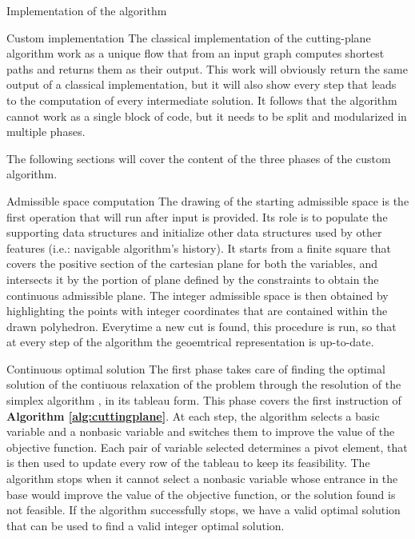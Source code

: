 \documentclass[9pt]{extarticle}
\begin{document}
\begin{section}{Implementation of the algorithm}
        \begin{subsection}{Custom implementation}
            The classical implementation of the cutting-plane algorithm work as a unique flow that from an input graph computes shortest paths 
            and returns them as their output.
            This work will obviously return the same output of a classical implementation, but it will also show every step that
            leads to the computation of every intermediate solution.
            It follows that the algorithm cannot work as a single block of code, but it needs to be split and modularized in multiple phases.

            The following sections will cover the content of the three phases of the custom algorithm.

            \begin{subsubsection}{Admissible space computation}
                The drawing of the starting admissible space is the first operation that will run after input is provided. 
                Its role is to populate the supporting data structures and initialize other data structures used by other features 
                (i.e.: navigable algorithm's history).
                It starts from a finite square that covers the positive section of the cartesian plane for both the variables, and intersects it
                by the portion of plane defined by the constraints to obtain the continuous admissible plane.
                The integer admissible space is then obtained by highlighting the points with integer coordinates that are contained within the
                drawn polyhedron.
                Everytime a new cut is found, this procedure is run, so that at every step of the algorithm the geoemtrical representation is
                up-to-date.
            \end{subsubsection}

            \begin{subsubsection}{Continuous optimal solution}
                The first phase takes care of finding the optimal solution of the contiuous relaxation of the problem through the resolution of
                the simplex algorithm \cite{wiki:simplex}, in its tableau form.
                This phase covers the first instruction of \textbf{Algorithm \ref{alg:cuttingplane}}.
                At each step, the algorithm selects a basic variable and a nonbasic variable and switches them to improve the value of the 
                objective function.
                Each pair of variable selected determines a pivot element, that is then used to update every row of the tableau to keep its feasibility.
                The algorithm stops when it cannot select a nonbasic variable whose entrance in the base would improve the value of the objective
                function, or the solution found is not feasible.
                If the algorithm successfully stops, we have a valid optimal solution that can be used to find a valid integer optimal solution. 
            \end{subsubsection}


\end{subsection}
\end{section}
\end{document}
